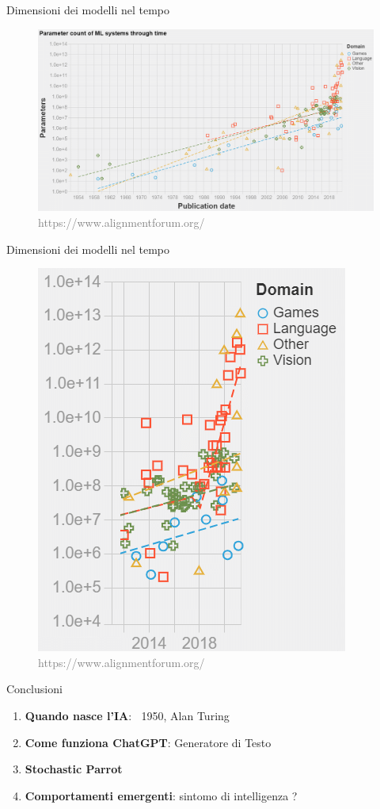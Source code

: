 \documentclass{beamer}
\begin{document}
\begin{frame}{Dimensioni dei modelli nel tempo}
    \begin{figure}
        \centering
        \includegraphics[width=0.9\linewidth]{imgs/emergent/nnsizes.png}
        \caption*{\tiny\textcolor{gray}{https://www.alignmentforum.org/}}
    \end{figure}
\end{frame}

\begin{frame}{Dimensioni dei modelli nel tempo}
    \begin{figure}
        \centering
        \includegraphics[width=0.5\linewidth]{imgs/emergent/nnzoom.png}
        \caption*{\tiny\textcolor{gray}{https://www.alignmentforum.org/}}
    \end{figure}
\end{frame}

    
\begin{frame}{Conclusioni}
    \begin{enumerate}
        \item \textbf{Quando nasce l'IA}: \pause  $~$ 1950, Alan Turing
        \pause
        \item \textbf{Come funziona ChatGPT}: \pause Generatore di Testo
        \pause
        \item \textbf{Stochastic Parrot}
        \pause
        \item \textbf{Comportamenti emergenti}: sintomo di intelligenza ?
    \end{enumerate}
\end{frame}
\end{document}

